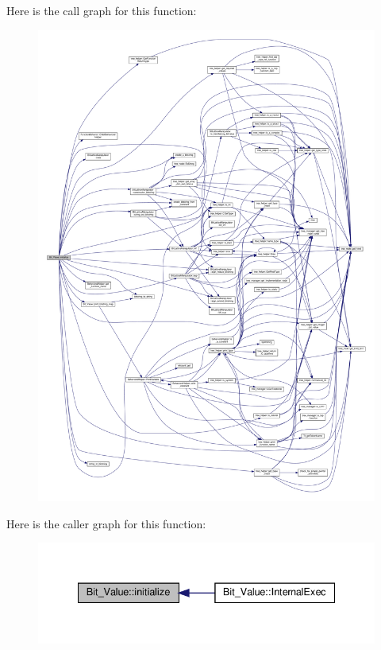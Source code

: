 Here is the call graph for this function\+:
\nopagebreak
\begin{figure}[H]
\begin{center}
\leavevmode
\includegraphics[width=350pt]{df/d4b/classBit__Value_acb5ecbfd885e6478546792c4a446364c_cgraph}
\end{center}
\end{figure}
Here is the caller graph for this function\+:
\nopagebreak
\begin{figure}[H]
\begin{center}
\leavevmode
\includegraphics[width=335pt]{df/d4b/classBit__Value_acb5ecbfd885e6478546792c4a446364c_icgraph}
\end{center}
\end{figure}
\mbox{\label{classBit__Value_ad953c9d31beaef0358204674ef9308e5}} 
